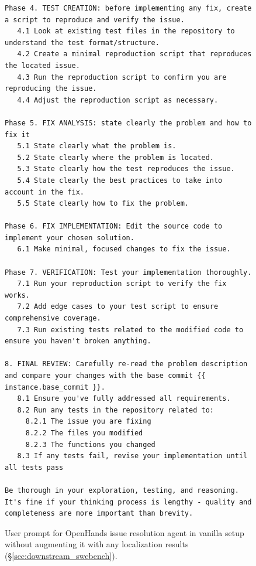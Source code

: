 \begin{figure}[!h]
\begin{tcolorbox}[colback=purple!6!white, colframe=purple!75!black, title={\small User Prompt for OpenHands Issue Resolution Agent (Vanilla Setting)}]
\begin{lstlisting}[basicstyle=\fontsize{6.5}{8}\ttfamily]
Phase 4. TEST CREATION: before implementing any fix, create a script to reproduce and verify the issue.
   4.1 Look at existing test files in the repository to understand the test format/structure.
   4.2 Create a minimal reproduction script that reproduces the located issue.
   4.3 Run the reproduction script to confirm you are reproducing the issue.
   4.4 Adjust the reproduction script as necessary.

Phase 5. FIX ANALYSIS: state clearly the problem and how to fix it
   5.1 State clearly what the problem is.
   5.2 State clearly where the problem is located.
   5.3 State clearly how the test reproduces the issue.
   5.4 State clearly the best practices to take into account in the fix.
   5.5 State clearly how to fix the problem.

Phase 6. FIX IMPLEMENTATION: Edit the source code to implement your chosen solution.
   6.1 Make minimal, focused changes to fix the issue.

Phase 7. VERIFICATION: Test your implementation thoroughly.
   7.1 Run your reproduction script to verify the fix works.
   7.2 Add edge cases to your test script to ensure comprehensive coverage.
   7.3 Run existing tests related to the modified code to ensure you haven't broken anything.

8. FINAL REVIEW: Carefully re-read the problem description and compare your changes with the base commit {{ instance.base_commit }}.
   8.1 Ensure you've fully addressed all requirements.
   8.2 Run any tests in the repository related to:
     8.2.1 The issue you are fixing
     8.2.2 The files you modified
     8.2.3 The functions you changed
   8.3 If any tests fail, revise your implementation until all tests pass

Be thorough in your exploration, testing, and reasoning. It's fine if your thinking process is lengthy - quality and completeness are more important than brevity.

\end{lstlisting}
\end{tcolorbox}
\caption{User prompt for OpenHands issue resolution agent in vanilla setup without augmenting it with any localization results (\S\ref{sec:downstream_swebench}).}
\label{fig:user_prompt_vanilla}
\end{figure}

